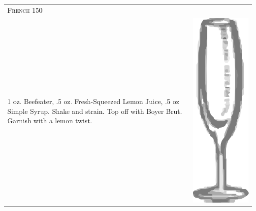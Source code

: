 \documentclass{article}
\begin{document}
\begin{tabular}{p{2in} p{0.5in}}
	\multicolumn{2}{p{3in}}{\centering\Huge\textsc{French 150}}\\ 
	   \vspace{-0.1in}1 oz. Beefeater, .5 oz. Fresh-Squeezed Lemon Juice, .5 oz Simple Syrup. Shake and strain. Top off with Boyer Brut. Garnish with a lemon twist. &
	   \vspace{-0.1in} \includegraphics{flute.png}
\end{tabular}\\
\end{document}
